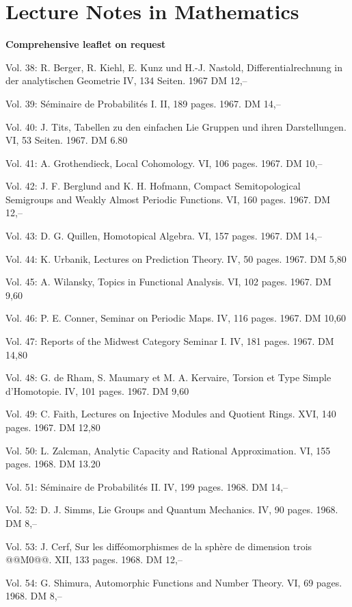 \section*{Lecture Notes in Mathematics}
\textbf{Comprehensive leaflet on request}

Vol. 38: R. Berger, R. Kiehl, E. Kunz und H.-J. Nastold, Differentialrechnung in der analytischen Geometrie IV, 134 Seiten. 1967 DM 12,--

Vol. 39: Séminaire de Probabilités I. II, 189 pages. 1967. DM 14,--

Vol. 40: J. Tits, Tabellen zu den einfachen Lie Gruppen und ihren Darstellungen. VI, 53 Seiten. 1967. DM 6.80

Vol. 41: A. Grothendieck, Local Cohomology. VI, 106 pages. 1967. DM 10,--

Vol. 42: J. F. Berglund and K. H. Hofmann, Compact Semitopological Semigroups and Weakly Almost Periodic Functions. VI, 160 pages. 1967. DM 12,--

Vol. 43: D. G. Quillen, Homotopical Algebra. VI, 157 pages. 1967. DM 14,--

Vol. 44: K. Urbanik, Lectures on Prediction Theory. IV, 50 pages. 1967. DM 5,80

Vol. 45: A. Wilansky, Topics in Functional Analysis. VI, 102 pages. 1967. DM 9,60

Vol. 46: P. E. Conner, Seminar on Periodic Maps. IV, 116 pages. 1967. DM 10,60

Vol. 47: Reports of the Midwest Category Seminar I. IV, 181 pages. 1967. DM 14,80

Vol. 48: G. de Rham, S. Maumary et M. A. Kervaire, Torsion et Type Simple d'Homotopie. IV, 101 pages. 1967. DM 9,60

Vol. 49: C. Faith, Lectures on Injective Modules and Quotient Rings. XVI, 140 pages. 1967. DM 12,80

Vol. 50: L. Zalcman, Analytic Capacity and Rational Approximation. VI, 155 pages. 1968. DM 13.20

Vol. 51: Séminaire de Probabilités II. IV, 199 pages. 1968. DM 14,--

Vol. 52: D. J. Simms, Lie Groups and Quantum Mechanics. IV, 90 pages. 1968. DM 8,--

Vol. 53: J. Cerf, Sur les difféomorphismes de la sphère de dimension trois @@M0@@. XII, 133 pages. 1968. DM 12,--

Vol. 54: G. Shimura, Automorphic Functions and Number Theory. VI, 69 pages. 1968. DM 8,--

